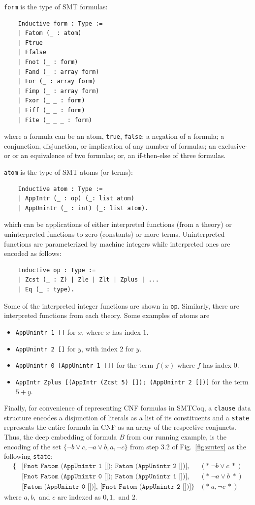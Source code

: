 \documentclass{article}
\begin{document}
	\medskip
	
	\texttt{form} is the type of 
	SMT formulas:
	\begin{verbatim}
	Inductive form : Type :=
	| Fatom (_ : atom)
	| Ftrue
	| Ffalse
	| Fnot (_ : form)
	| Fand (_ : array form)
	| For (_ : array form)
	| Fimp (_ : array form)
	| Fxor (_ _ : form)
	| Fiff (_ _ : form)
	| Fite (_ _ _ : form)
	\end{verbatim}
	where a formula can be an atom, 
	\texttt{true}, \texttt{false};
	a negation of a formula; a 
	conjunction, disjunction, or 
	implication of any number of
	formulas; an exclusive-or or
	an equivalence of two formulas; 
	or, an if-then-else of three formulas.
	
	\medskip
	\texttt{atom} is the type of SMT atoms
	(or terms):
	\begin{verbatim}
	Inductive atom : Type :=
	| AppIntr (_ : op) (_: list atom)
	| AppUnintr (_ : int) (_: list atom).	
	\end{verbatim} 
	which can be applications of 
	either interpreted functions 
	(from a theory) or uninterpreted
	functions to zero (constants) or more 
	terms. Uninterpreted functions 
	are parameterized by machine 
	integers while interpreted ones 
	are encoded as follows:
	\begin{verbatim}
	Inductive op : Type :=
	| Zcst (_ : Z) | Zle | Zlt | Zplus | ...
	| Eq (_ : type).
	\end{verbatim}
	Some of the interpreted integer 
	functions are shown in \texttt{op}.
	Similarly, there are interpreted 
	functions from each theory.
	Some examples of atoms are 
	\begin{itemize}
		\item \texttt{AppUnintr	1 []} for $x$,
			where $x$ has index $1$.
		\item \texttt{AppUnintr 2 []} for $y$,
			with index $2$ for $y$.
		\item \texttt{AppUnintr 0 [AppUnintr 
			1 []]} for the term $f(x)$ where 
			$f$ has index $0$.
		\item \texttt{AppIntr Zplus [(AppIntr 
			(Zcst 5) []); (AppUnintr 2 [])]} 
		for the term $5 + y$.
	\end{itemize}
	Finally, for convenience of representing 
	CNF formulas in SMTCoq, a \texttt{clause} 
	data structure encodes a disjunction of 
	literals as a list of its constituents 
	and a \texttt{state} represents the entire 
	formula in CNF as an array of the 
	respective conjuncts. Thus, the deep 
	embedding of formula $B$ from our running 
	example, is the encoding of the set 
	$\{\neg b \lor c, \neg a \lor b, a, 
	\neg c\}$ from step 3.2 of 
	Fig.~\ref{fig:smtex} 
	as the following \texttt{state}:
	\begin{align*}
	\{&\texttt{[Fnot Fatom (AppUnintr 1 []); 
		Fatom (AppUnintr 2 [])],} &(*\ \neg b \lor c\ *)\\
	&\texttt{[Fnot Fatom (AppUnintr 0 []);
		Fatom (AppUnintr 1 [])],} &(*\ \neg a \lor b\ *)\\
	&\texttt{[Fatom (AppUnintr 0 [])],
		[Fnot Fatom (AppUnintr 2 [])]}\} &(*\ a, \neg c\ *)  
	\end{align*}
	where $a, b,$ and $c$ are indexed as 
	$0, 1,$ and $2$.
	
\end{document}
